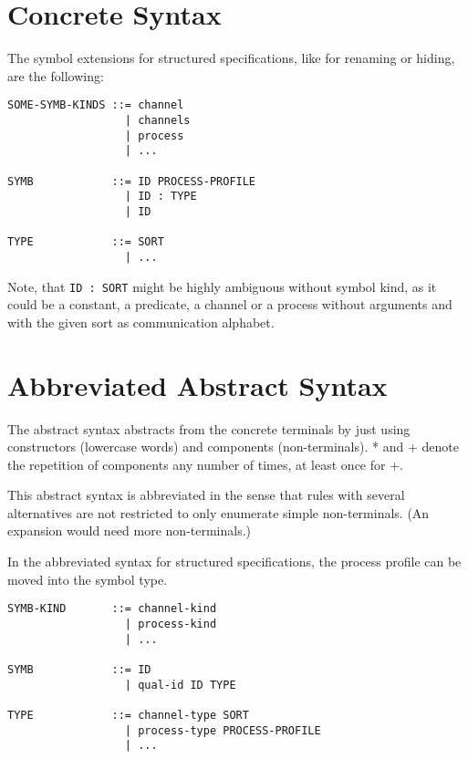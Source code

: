 \documentclass{article}
\begin{document}
\section{Concrete Syntax}



The symbol extensions for structured specifications, like for renaming or hiding,
are the following:

\begin{verbatim}
SOME-SYMB-KINDS ::= channel
                  | channels
                  | process
                  | ...

SYMB            ::= ID PROCESS-PROFILE
                  | ID : TYPE
                  | ID

TYPE            ::= SORT
                  | ...
\end{verbatim}

Note, that \verb|ID : SORT| might be highly ambiguous without symbol kind, as
it could be a constant, a predicate, a channel or a process without arguments
and with the given sort as communication alphabet.

\section{Abbreviated Abstract Syntax}

The abstract syntax abstracts from the concrete terminals by just using
constructors (lowercase words) and components (non-terminals). * and + denote
the repetition of components any number of times, at least once for +.

This abstract syntax is abbreviated in the sense that rules with several
alternatives are not restricted to only enumerate simple non-terminals.
(An expansion would need more non-terminals.)



In the abbreviated syntax for structured specifications, the process profile
can be moved into the symbol type.

\begin{verbatim}
SYMB-KIND       ::= channel-kind
                  | process-kind
                  | ...

SYMB            ::= ID
                  | qual-id ID TYPE

TYPE            ::= channel-type SORT
                  | process-type PROCESS-PROFILE
                  | ...
\end{verbatim}
\end{document}
